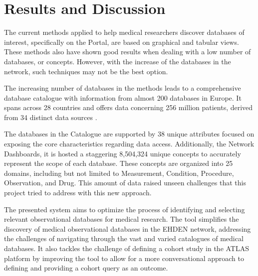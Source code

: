 \chapter{Results and Discussion}
\label{chapter:RD}



The current methods applied to help medical researchers discover databases of interest, specifically on the {\ehden} Portal, are based on graphical and tabular views. These methods also have shown good results when dealing with a low number of databases, or concepts. However, with the increase of the databases in the network, such techniques may not be the best option.

The increasing number of databases in the {\ehden} methods leads to a comprehensive database catalogue with information from almost 200 databases in Europe. It spans across 28 countries and offers data concerning 256 million patients, derived from 34 distinct data sources \citet{MIE}. 

The databases in the {\ehden} Catalogue are supported by 38 unique attributes focused on exposing the core characteristics regarding data access. Additionally, the {\ehden} Network Dashboards, it is hosted a staggering 8,504,324 unique concepts to accurately represent the scope of each database. These concepts are organized into 25 domains, including but not limited to Measurement, Condition, Procedure, Observation, and Drug. This amount of data raised unseen challenges that this project tried to address with this new approach.

The presented system aims to optimize the process of identifying and selecting relevant observational databases for medical research. The tool simplifies the discovery of medical observational databases in the EHDEN network, addressing the challenges of navigating through the vast and varied catalogues of medical databases. It also tackles the challenge of defining a cohort study in the ATLAS platform by improving the tool to allow for a more conversational approach to defining and providing a cohort query as an outcome.

